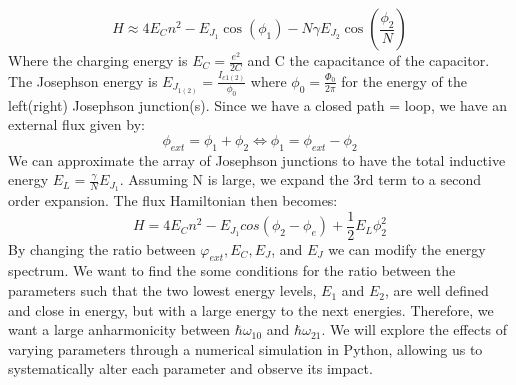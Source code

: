     \begin{equation}
        H \approx 4 E_C n^2-E_{J_{1}} \cos (\phi_1)- N \gamma E_{J_{2}} \cos (\frac{\phi_2}{N})
    \end{equation}
    Where the charging energy is $E_C = \frac{e^2}{2C}$ and C the capacitance of the capacitor. The Josephson energy is  $E_{J_{1(2)}} = \frac{I_{c1(2)}}{\phi_0}$ where $\phi_0 = \frac{\Phi_0}{2\pi}$ for the energy of the left(right) Josephson junction(s). Since we have a closed path = loop, we have an external flux given by: 
    \begin{equation}
        \phi_{ext} = \phi_1 + \phi_2 	\Leftrightarrow \phi_1 = \phi_{ext} -\phi_2
    \end{equation}
    We can approximate the array of Josephson junctions to have the total inductive energy $E_L = \frac{\gamma}{N} E_{J_{1}}$. Assuming N is large, we expand the 3rd term to a second order expansion. The flux Hamiltonian then becomes: 
    \begin{equation}\label{eq:hamiltonian_fluxonium}
        H = 4E_Cn^2- E_{J_{1}}cos(\phi_2 - \phi_e) + \frac{1}{2}E_L \phi_{2}^{2}
    \end{equation}
    By changing the ratio between $\varphi_{ext}, E_C, E_J$, and $E_J$ we can modify the energy spectrum. We want to find the some conditions for the ratio between the parameters such that the two lowest energy levels, $E_1$ and $E_2$, are well defined and close in energy, but with a large energy to the next energies. Therefore, we want a large anharmonicity between $\hbar \omega_{10}$ and $\hbar \omega_{21}$. We will explore the effects of varying parameters through a numerical simulation in Python, allowing us to systematically alter each parameter and observe its impact.

